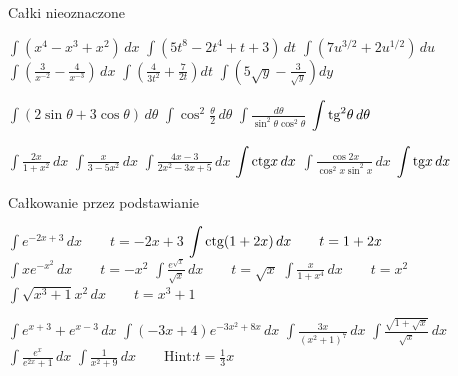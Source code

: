 \documentclass[12pt,a4paper]{article}
\begin{document}
	
	\begin{center}
		\Large Całki nieoznaczone
	\end{center}\normalsize


	{$\displaystyle \int (x^4 - x^3 + x^2) \, dx$}
	{$\displaystyle \int (5t^8 - 2t^4 + t + 3) \, dt$}
	{$\displaystyle \int (7u^{3/2} + 2u^{1/2}) \, du$}
	{$\displaystyle \int (\frac{3}{x^{-2}} - \frac{4}{x^{-3}}) \, dx$}
	{$\displaystyle \int \left( \frac{4}{3t^2} + \frac{7}{2t} \right) dt$}
	{$\displaystyle \int \left( 5\sqrt{y} - \frac{3}{\sqrt{y}} \right) dy$}

	\vspace{0.4cm}

	{$\displaystyle \int (2\sin \theta + 3\cos \theta) \, d\theta$}
	{$\displaystyle \int \cos^2 \frac{\theta}{2} \, d\theta$}
	{$\displaystyle \int \frac{d\theta}{\sin^2\theta \cos^2\theta}$}
	{$\displaystyle \int \text{tg}^2\theta \, d\theta$}

	\vspace{0.4cm}
	
	
	{$\displaystyle \int  \frac{2x}{1+x^2}\, dx$}
	{$\displaystyle \int  \frac{x}{3-5x^2}\, dx$}
	{$\displaystyle \int  \frac{4x-3}{2x^2-3x+5}\, dx$}
	{$\displaystyle \int  \text{ctg} x\, dx$}
	{$\displaystyle \int  \frac{\cos2x}{\cos^2x\sin^2x}\, dx$}
	{$\displaystyle \int  \text{tg} x\, dx$}

	\newpage

	\begin{center}
		\Large Całkowanie przez podstawianie
	\end{center}\normalsize

	{$\displaystyle \int e^{-2x+3}\, dx \qquad t=-2x+3$}
	{$\displaystyle \int \text{ctg}(1+2x)\, dx \qquad t=1+2x$}
	{$\displaystyle \int xe^{-x^2}\, dx \qquad t=-x^2$}
	{$\displaystyle \int \frac{e^{\sqrt{x}}}{\sqrt{x}} \, dx \qquad t=\sqrt{x}$}
	{$\displaystyle \int \frac{x}{1+x^4}\, dx \qquad t=x^2$}
	{$\displaystyle \int \sqrt{x^3+1} x^2 \, dx \qquad t=x^3+1$}
	
	\vspace{0.4cm}
	
	{$\displaystyle \int e^{x+3} + e^{x-3}\, dx$}
	{$\displaystyle \int (-3x+4)e^{-3x^2+8x}\, dx$}
	{$\displaystyle \int \frac{3x}{(x^2+1)^7}\, dx$}
	{$\displaystyle \int \frac{\sqrt{1+\sqrt{x}}}{\sqrt{x}}\, dx$}
	{$\displaystyle \int \frac{e^x}{e^{2x}+1}\, dx$}
	{$\displaystyle \int \frac{1}{x^2+9}\, dx \qquad \text{Hint:} t=\frac{1}{3}x$}
	
\end{document}
